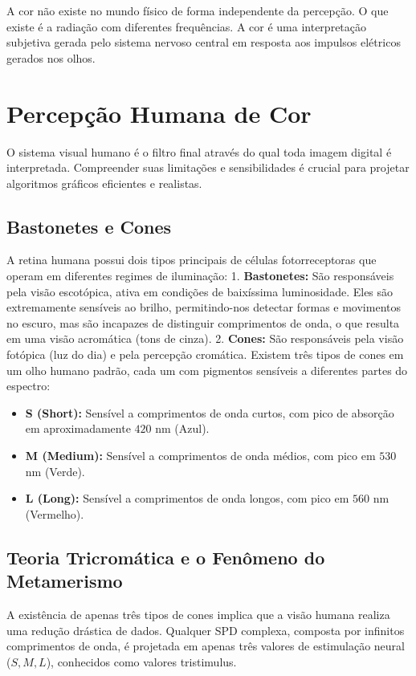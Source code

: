 A cor não existe no mundo físico de forma independente da percepção. O que existe é a radiação com diferentes frequências. A cor é uma interpretação subjetiva gerada pelo sistema nervoso central em resposta aos impulsos elétricos gerados nos olhos.

\section{Percepção Humana de Cor}

O sistema visual humano é o filtro final através do qual toda imagem digital é interpretada. Compreender suas limitações e sensibilidades é crucial para projetar algoritmos gráficos eficientes e realistas.

\subsection{Bastonetes e Cones}

A retina humana possui dois tipos principais de células fotorreceptoras que operam em diferentes regimes de iluminação:
1. \textbf{Bastonetes:} São responsáveis pela visão escotópica, ativa em condições de baixíssima luminosidade. Eles são extremamente sensíveis ao brilho, permitindo-nos detectar formas e movimentos no escuro, mas são incapazes de distinguir comprimentos de onda, o que resulta em uma visão acromática (tons de cinza).
2. \textbf{Cones:} São responsáveis pela visão fotópica (luz do dia) e pela percepção cromática. Existem três tipos de cones em um olho humano padrão, cada um com pigmentos sensíveis a diferentes partes do espectro:
\begin{itemize}
    \item \textbf{S (Short):} Sensível a comprimentos de onda curtos, com pico de absorção em aproximadamente $420$ nm (Azul).
    \item \textbf{M (Medium):} Sensível a comprimentos de onda médios, com pico em $530$ nm (Verde).
    \item \textbf{L (Long):} Sensível a comprimentos de onda longos, com pico em $560$ nm (Vermelho).
\end{itemize}

\subsection{Teoria Tricromática e o Fenômeno do Metamerismo}

A existência de apenas três tipos de cones implica que a visão humana realiza uma redução drástica de dados. Qualquer SPD complexa, composta por infinitos comprimentos de onda, é projetada em apenas três valores de estimulação neural ($S, M, L$), conhecidos como valores tristimulus.

